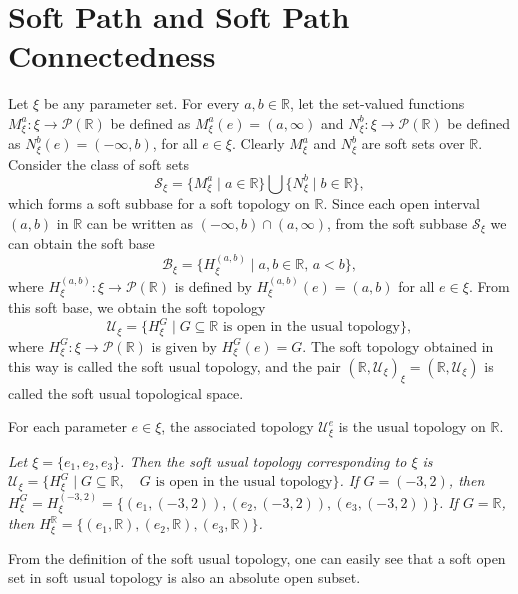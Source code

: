 \documentclass[preprint,12pt]{elsarticle}
\begin{document}
\section{Soft Path and Soft Path Connectedness }
Let $\xi$ be any parameter set. For every  $a,b \in \mathbb{R}$, let the set-valued functions \(M^a_\xi:\xi \to \mathcal{P}(\mathbb{R})\) be defined as \(M^a_\xi(e) = (a,\infty)\) and \(N^b_\xi:\xi \to \mathcal{P}(\mathbb{R})\) be defined as \(N^b_\xi(e) = (-\infty,b)\), for all $e\in \xi$.
Clearly $M^a_\xi$ and $N^b_\xi$ are soft sets over $\mathbb{R}$. Consider the class of soft sets
\[\mathscr{S}_\xi = \{M^a_\xi \mid a \in \mathbb{R}\} {\bigcup} \{N^b_\xi \mid b \in \mathbb{R}\} ,\]
which forms a soft subbase for a soft topology on $\mathbb{R}$.  Since each open interval $(a,b)$ in $\mathbb{R}$ can be written as $(-\infty,b)\cap(a,\infty)$,
from the soft subbase $\mathscr{S}_\xi $ we can obtain the soft base
\[
\mathscr{B}_\xi  = \{H^{(a,b)}_\xi \mid a,b \in \mathbb{R},\, a<b\},
\]
where $H^{(a,b)}_\xi:\xi \to \mathcal{P}(\mathbb{R})$ is defined by
\(
H^{(a,b)}_\xi(e) = (a,b)
\) for all $e\in \xi$.
From this soft base, we obtain the soft topology
\[\mathscr{U}_\xi = \{H^G_\xi \mid G \subseteq \mathbb{R} \text{ is open in the usual topology}\},\]
where $H^G_\xi:\xi \to \mathcal{P}(\mathbb{R})$ is given by $H^G_\xi(e)=G$.
The soft topology obtained in this way is called the soft usual topology, and the pair $(\mathbb{R},\mathscr{U}_\xi)_\xi=(\mathbb{R},\mathscr{U}_\xi)$ is called the soft usual topological space.

For each parameter $e \in \xi$, the associated topology $\mathscr{U}_{\xi}^e$ is the usual topology on $\mathbb{R}$.
\begin{ex}\em{
 Let $\xi=\{e_1,e_2,e_3\}$. Then the soft usual topology corresponding to $\xi$ is $\mathscr{U}_\xi=\{H^G_\xi \mid G \subseteq \mathbb{R}, \quad G \text{ is open in the usual topology}\}$. If $G=(-3,2)$, then
 $H^G_\xi=H^{(-3,2)}_\xi=\{(e_1,(-3,2)),(e_2,(-3,2)),(e_3,(-3,2))\}$. If $G=\mathbb{R}$, then $H^\mathbb{R}_\xi=\{(e_1,\mathbb{R}),(e_2,\mathbb{R}),(e_3,\mathbb{R})\}$.}
\end{ex}
From the definition of the soft usual topology, one can easily see that  a soft open set in soft usual topology is also an absolute open subset.
\end{document}
